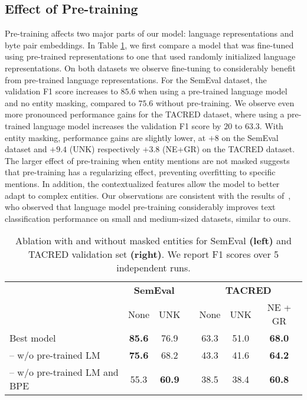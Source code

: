 \documentclass[akbc,twoside,11pt]{article}
\begin{document}
\subsection{Effect of Pre-training}
Pre-training affects two major parts of our model: language representations and byte pair embeddings. In Table \ref{tab:ablation_masking}, we first compare a model that was fine-tuned using pre-trained representations to one that used randomly initialized language representations. On both datasets we observe fine-tuning to considerably benefit from pre-trained language representations. For the SemEval dataset, the validation F1 score increases to $85.6$ when using a pre-trained language model and no entity masking, compared to $75.6$ without pre-training. We observe even more pronounced performance gains for the TACRED dataset, where using a pre-trained language model increases the validation F1 score by $20$ to $63.3$. With entity masking, performance gains are slightly lower, at $+8$ on the SemEval dataset and $+9.4$ (UNK) respectively $+3.8$ (NE$+$GR) on the TACRED dataset. The larger effect of pre-training when entity mentions are not masked suggests that pre-training has a regularizing effect, preventing overfitting to specific mentions. In addition, the contextualized features allow the model to better adapt to complex entities. Our observations are consistent with the results of~\citet{ruder_universallm_2018}, who observed that language model pre-training considerably improves text classification performance on small and medium-sized datasets, similar to ours.

\begin{table}[ht!]
    \begin{center}
        \begin{tabular}{l@{\hskip .5in} c c c@{\hskip .3in} c c c}
            \hline
             & \multicolumn{2}{c}{\textbf{SemEval}} & & \multicolumn{3}{c}{\textbf{TACRED}} \\
& None & UNK & & None & UNK & NE + GR \\
            \hline
            Best model & \textbf{85.6} & 76.9 & & 63.3 & 51.0 & \textbf{68.0} \\
            -- w/o pre-trained LM & \textbf{75.6} & 68.2 & & 43.3 & 41.6 & \textbf{64.2} \\
            -- w/o pre-trained LM and BPE & 55.3 & \textbf{60.9} & & 38.5 & 38.4 & \textbf{60.8} \\
            \hline
        \end{tabular}
        \caption{Ablation with and without masked entities for SemEval \textbf{(left)} and TACRED validation set \textbf{(right)}. We report F1 scores over 5 independent runs.}
        \label{tab:ablation_masking}
    \end{center}
\end{table}
\end{document}
